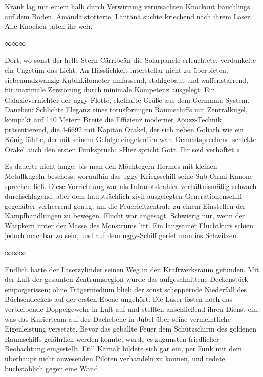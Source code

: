 Kränk lag mit einem halb durch Verwirrung verursachten Knockout bäuchlings auf dem Boden. Ämändä stotterte, Läntänä suchte kriechend nach ihrem Laser. Alle Knochen taten ihr weh.

\begin{center}
	∞∞∞
\end{center}

Dort, wo sonst der helle Stern Cärribeän die Solarpanele erleuchtete, verdunkelte ein Ungetüm das Licht. An Hässlichkeit interstellar nicht zu überbieten, siebenundzwanzig Kubikkilometer umfassend, stahlgebaut und waffenstarrend, für maximale Zerstörung durch minimale Kompetenz ausgelegt: Ein Galaxievernichter der uggy-Flotte, ekelhafte Grüße aus dem Germania-System. Daneben: Schlichte Eleganz eines torusförmigen Raumschiffs mit Zentralkugel, kompakt auf 140 Metern Breite die Effizienz moderner Äöüzz-Technik präsentierend, die 4-6692 mit Kapitän Orakel, der sich neben Goliath wie ein König fühlte, der mit seinem Gefolge eingetroffen war. Dementsprechend schickte Orakel auch den ersten Funkspruch: »Hier spricht Gott. Ihr seid verhaftet.«

Es dauerte nicht lange, bis man den Möchtegern-Hermes mit kleinen Metallkugeln beschoss, woraufhin das uggy-Kriegsschiff seine Sub-Omni-Kanone sprechen ließ. Diese Vorrichtung war als Infrarotstrahler verhältnismäßig schwach durchschlagend, aber dem hauptsächlich zivil ausgelegten Generationenschiff gegenüber verheerend genug, um die Feuerleitzentrale zu einem Einstellen der Kampfhandlungen zu bewegen. Flucht war angesagt. Schwierig nur, wenn der Warpkern unter der Masse des Monstrums litt. Ein langsamer Fluchtkurs schien jedoch machbar zu sein, und auf dem uggy-Schiff geriet man ins Schwitzen.

\begin{center}
	∞∞∞
\end{center}

Endlich hatte der Laserzylinder seinen Weg in den Kraftwerksraum gefunden. Mit der Luft der gesamten Zentrumsregion wurde das aufgeschnittene Deckenstück emporgerissen; ohne Trägermedium blieb der sonst scheppernde Niederfall des Büchsendeckels auf der ersten Ebene ungehört. Die Laser lösten noch das verbleibende Doppelgewehr in Luft auf und stellten anschließend ihren Dienst ein, was das Kurierteam auf der Dachebene in Jubel über seine vermeintliche Eigenleistung versetzte. Bevor das geballte Feuer dem Schutzschirm des goldenen Raumschiffs gefährlich werden konnte, wurde es zugunsten friedlicher Beobachtung eingestellt. Füll Kärnäk bildete sich gar ein, per Funk mit dem überhaupt nicht anwesenden Piloten verhandeln zu können, und redete buchstäblich gegen eine Wand.

